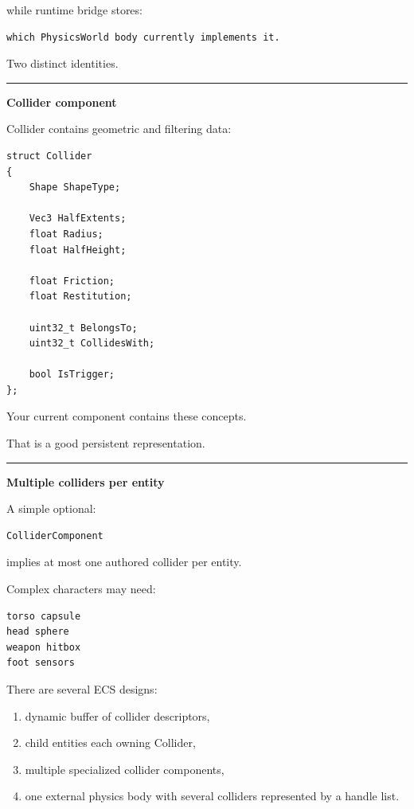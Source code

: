 while runtime bridge stores:

\begin{verbatim}
which PhysicsWorld body currently implements it.
\end{verbatim}

Two distinct identities.

\begin{center}\rule{0.5\linewidth}{0.5pt}\end{center}

\textbf{Collider component}

Collider contains geometric and filtering data:

\begin{verbatim}
struct Collider
{
    Shape ShapeType;

    Vec3 HalfExtents;
    float Radius;
    float HalfHeight;

    float Friction;
    float Restitution;

    uint32_t BelongsTo;
    uint32_t CollidesWith;

    bool IsTrigger;
};
\end{verbatim}

Your current component contains these concepts.

That is a good persistent representation.

\begin{center}\rule{0.5\linewidth}{0.5pt}\end{center}

\textbf{Multiple colliders per entity}

A simple optional:

\begin{verbatim}
ColliderComponent
\end{verbatim}

implies at most one authored collider per entity.

Complex characters may need:

\begin{verbatim}
torso capsule
head sphere
weapon hitbox
foot sensors
\end{verbatim}

There are several ECS designs:

\begin{enumerate}
\def\labelenumi{\arabic{enumi}.}
\tightlist
\item
  dynamic buffer of collider descriptors,
\item
  child entities each owning Collider,
\item
  multiple specialized collider components,
\item
  one external physics body with several colliders represented by a handle list.
\end{enumerate}

